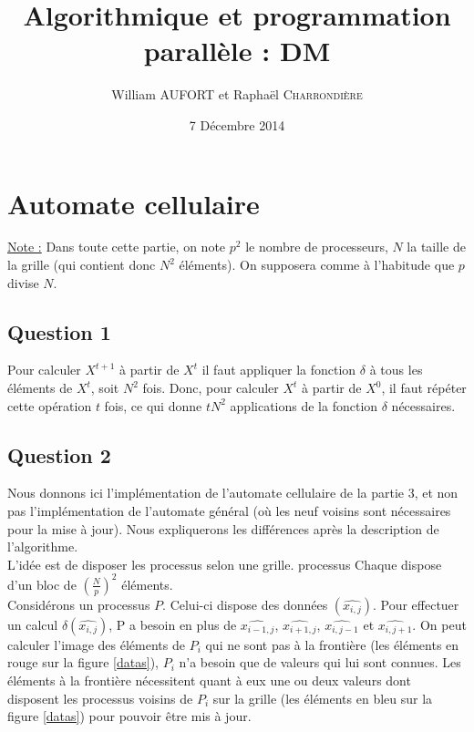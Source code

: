 \documentclass{article}
\title{Algorithmique et programmation parallèle : DM}
\author{William \textsc{AUFORT} et Raphaël \textsc{Charrondière}}
\date{7 Décembre 2014}
\newcommand{\X}[1]{{X}^{ #1 }}
\begin{document}
\maketitle

\section{Automate cellulaire}

\underline{Note :} Dans toute cette partie, on note $p^2$ le nombre de processeurs, $N$ la taille de la grille (qui contient donc $N^2$ éléments).
On supposera comme à l'habitude que $p$ divise $N$.

\subsection*{Question 1}

Pour calculer $\X{t+1}$ à partir de $\X{t}$ il faut appliquer la fonction $\delta$ à tous les éléments de $\X{t}$, soit $N^2$ fois.
Donc, pour calculer $\X{t}$ à partir de $\X{0}$, il faut répéter cette opération $t$ fois, ce qui donne $t N^2$ applications de la fonction $\delta$ nécessaires.

\subsection*{Question 2}

Nous donnons ici l'implémentation de l'automate cellulaire de la partie 3, et non pas l'implémentation de l'automate général (où les neuf voisins sont nécessaires pour la mise à jour). Nous expliquerons les différences après la description de l'algorithme. \\

L'idée est de disposer les processus selon une grille. processus Chaque dispose d'un bloc de $\left( \frac{N}{p} \right) ^2$ éléments.\\

Considérons un processus $P$. Celui-ci dispose des données $(\widehat{x_{i,j}})$.
Pour effectuer un calcul $\delta(\widehat{x_{i,j}})$, P a besoin en plus de $\widehat{x_{i-1,j}}$, $\widehat{x_{i+1,j}}$, $\widehat{x_{i,j-1}}$ et $\widehat{x_{i,j+1}}$.
On peut calculer l'image des éléments de $P_i$ qui ne sont pas à la frontière (les éléments en rouge sur la figure \ref{datas}), $P_i$ n'a besoin que de valeurs qui lui sont connues.
Les éléments à la frontière nécessitent quant à eux une ou deux valeurs dont disposent les processus voisins de $P_i$ sur la grille (les éléments en bleu sur la figure \ref{datas}) pour pouvoir être mis à jour.
\end{document}
